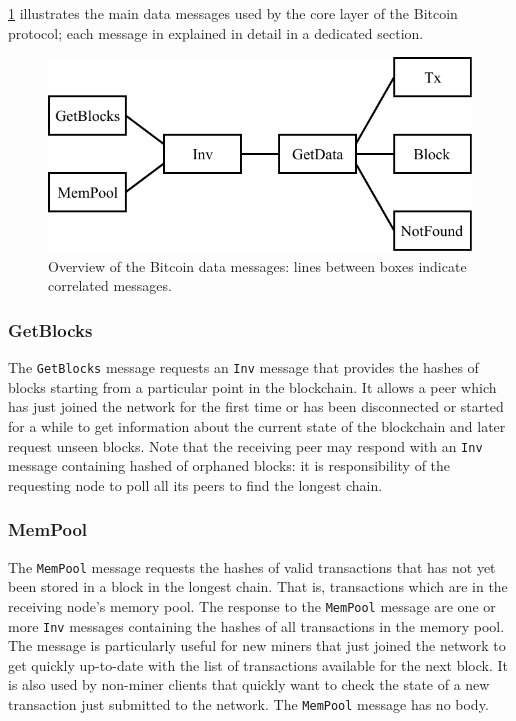 \medskip
\cref{fig:data-messages} illustrates the main data messages used by the core layer of the Bitcoin protocol;
each message in explained in detail in a dedicated section.

\begin{figure}[ht]
	\centering
	\vspace*{0.25cm}
	\includegraphics[scale=0.85]{figures/data_messages}
	\vspace*{0.25cm}
	\caption[Overview of the Bitcoin data messages]{
		Overview of the Bitcoin data messages:
		lines between boxes indicate correlated messages.
	}
	\label{fig:data-messages}
\end{figure}

\subsubsection{GetBlocks}
The \texttt{GetBlocks} message requests an \texttt{Inv} message that provides the hashes of blocks starting from a particular point in the blockchain.
It allows a peer which has just joined the network for the first time or has been disconnected or started for a while to get information about the current state of the blockchain and later request unseen blocks.
Note that the receiving peer may respond with an \texttt{Inv} message containing hashed of orphaned blocks:
it is responsibility of the requesting node to poll all its peers to find the longest chain.

\subsubsection{MemPool}
The \texttt{MemPool} message requests the hashes of valid transactions that has not yet been stored in a block in the longest chain.
That is, transactions which are in the receiving node’s memory pool.
The response to the \texttt{MemPool} message are one or more \texttt{Inv} messages containing the hashes of all transactions in the memory pool.
The message is particularly useful for new miners that just joined the network to get quickly up-to-date with the list of transactions available for the next block.
It is also used by non-miner clients that quickly want to check the state of a new transaction just submitted to the network.
The \texttt{MemPool} message has no body.

